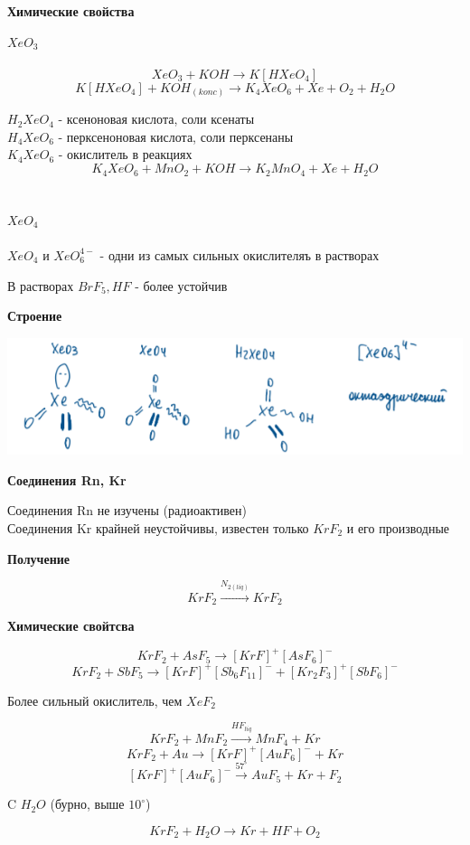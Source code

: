 \documentclass[14pt,a4paper]{scrartcl}
\begin{document}
\textbf{Химические свойства}

$XeO_3$\\
\\
$$XeO_3 + KOH \rightarrow K[HXeO_4]$$
$$K[HXeO_4] + KOH_{(konc)}  \rightarrow K_4XeO_6 + Xe + O_2 + H_2O$$

$H_2XeO_4$ - ксеноновая кислота, соли ксенаты\\
$H_4XeO_6$ - перксеноновая кислота, соли перксенаны\\

$K_4XeO_6$ - окислитель в реакциях\\
$$K_4XeO_6 + MnO_2 + KOH \rightarrow K_2MnO_4 + Xe + H_2O$$
\\
\\
$XeO_4$\\
\\
$XeO_4$ и $XeO_6^{4-}$ - одни из самых сильных окислителяъ в растворах

В растворах $BrF_5, HF$ - более устойчив

\textbf{Строение}

\includegraphics{13v4.png}

\textbf{Соединения Rn, Kr}

Соединения Rn не изучены (радиоактивен)\\
Соединения Kr крайней неустойчивы, известен только $KrF_2$ и его производные

\textbf{Получение}

$$KrF_2 \xrightarrow{N_{2(liq)}} KrF_2$$

\textbf{Химические свойтсва}

$$KrF_2 + AsF_5 \rightarrow [KrF]^+[AsF_6]^-$$
$$KrF_2 + SbF_5 \rightarrow [KrF]^+[Sb_6F_{11}]^- + [Kr_2F_3]^+[SbF_6]^-$$

Более сильный окислитель, чем $XeF_2$

$$KrF_2 + MnF_2 \xrightarrow{HF_{liq}} MnF_4 + Kr$$
$$KrF_2 + Au \rightarrow [KrF]^+[AuF_6]^- + Kr$$
$$[KrF]^+[AuF_6]^- \xrightarrow{57^{\circ}} AuF_5 + Kr + F_2$$

C $H_2O$ (бурно, выше $10^{\circ}$)

$$KrF_2 + H_2O \rightarrow Kr + HF + O_2$$ 
\end{document}
